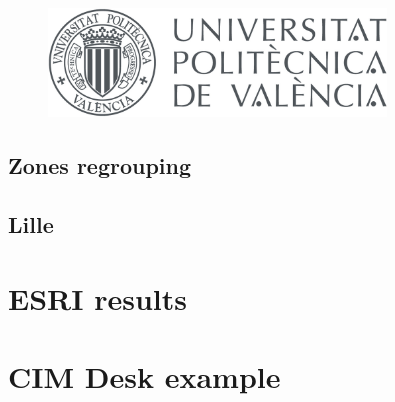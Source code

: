 \begin{figure}[ht]
    \bigskip
    \begin{center}
        \parbox[t]{0.8\textwidth}{
        \href{https://herge-portal.rte-france.com/arcgis/apps/webappviewer/index.html?id=84a7af442f014844b95939ce3c0067a}
            {\includegraphics[width=0.8\textwidth]{0.logos/UPV_horitzontal_color.jpg}}
        }
        \label{fig:FME scheme}
    \end{center}
\end{figure}

\subsection{Zones regrouping}

\subsection{Lille}

\section{ESRI results}

\section{CIM Desk example}
\label{sec:Diagram:CIMDesk}

